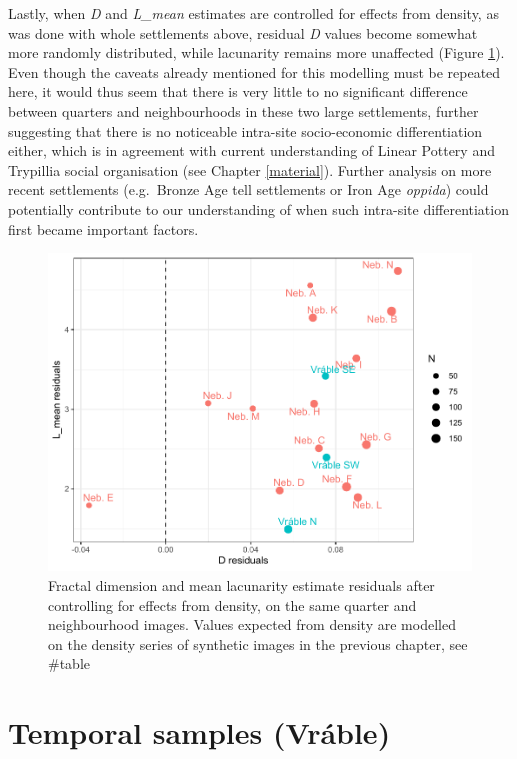 \documentclass[
  12pt,
]{book}
\begin{document}
Lastly, when \emph{D} and \emph{L\_mean} estimates are controlled for effects from density, as was done with whole settlements above, residual \emph{D} values become somewhat more randomly distributed, while lacunarity remains more unaffected (Figure \ref{fig:09-quart-resid}). Even though the caveats already mentioned for this modelling must be repeated here, it would thus seem that there is very little to no significant difference between quarters and neighbourhoods in these two large settlements, further suggesting that there is no noticeable intra-site socio-economic differentiation either, which is in agreement with current understanding of Linear Pottery and Trypillia social organisation (see Chapter \ref{material}). Further analysis on more recent settlements (e.g.~Bronze Age tell settlements or Iron Age \emph{oppida}) could potentially contribute to our understanding of when such intra-site differentiation first became important factors.



\begin{figure}

{\centering \includegraphics[width=0.9\linewidth]{bookdown-demo_files/figure-latex/09-quart-resid-1} 

}

\caption{Fractal dimension and mean lacunarity estimate residuals after controlling for effects from density, on the same quarter and neighbourhood images. Values expected from density are modelled on the density series of synthetic images in the previous chapter, see \#table}\label{fig:09-quart-resid}
\end{figure}

\hypertarget{temporal-samples-vruxe1ble-1}{%
\section{Temporal samples (Vráble)}\label{temporal-samples-vruxe1ble-1}}
\end{document}
